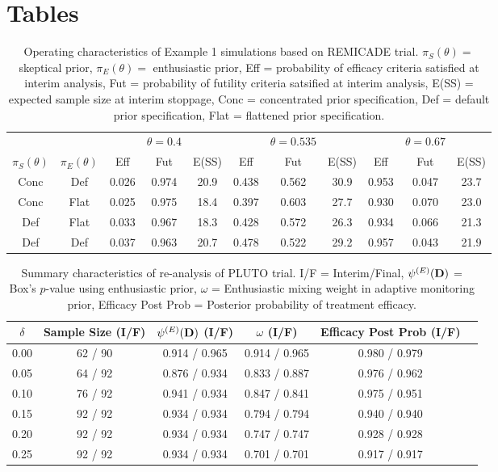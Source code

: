 \documentclass[12pt]{article}
\begin{document}
\newpage
\section*{Tables}

\begin{table}[htbp]\label{tbl:sim-remi}%
\centering
\caption{Operating characteristics of Example 1 simulations based on REMICADE trial. $\pi_S(\theta)=$ skeptical prior, $\pi_E(\theta)=$ enthusiastic prior, Eff = probability of efficacy criteria satisfied at interim analysis, Fut = probability of futility criteria satsified at interim analysis, E(SS) = expected sample size at interim stoppage, Conc = concentrated prior specification, Def = default prior specification, Flat = flattened prior specification. }%
\begin{tabular*}{500pt}{@{\extracolsep\fill}ccccccccccc@{\extracolsep\fill}}%
\toprule
	&		&	&		$\theta=0.4$&			&		&	$\theta=0.535$	&		&	&		$\theta=0.67$&		\\
	\cline{3-5} \cline{6-8} \cline{9-11}
$\pi_S(\theta)$	&	$\pi_E(\theta)$	&	Eff  &	Fut 	&	E(SS) &	Eff  &	Fut 	&	E(SS) 	&	Eff  &	Fut 	&	E(SS) 	\\
\midrule
Conc	&	Def	&	0.026	&	0.974	&	20.9 	&	0.438	&	0.562	&	30.9	&	0.953	&	0.047	&	23.7	\\
Conc	&	Flat	&	0.025	&	0.975	&	18.4 	&	0.397	&	0.603	&	27.7	&	0.930	&	0.070	&	23.0	\\
Def	&	Flat	&	0.033	&	0.967	&	18.3	&	0.428	&	0.572	&	26.3	&	0.934	&	0.066	&	21.3 	\\
Def	&	Def	&	0.037	&	0.963	&	20.7	&	0.478	&	0.522	&	29.2 	&	0.957	&	0.043	&	21.9	\\
\bottomrule
\end{tabular*}
\end{table}

\newpage
\begin{table}[htbp]\label{tbl:real-pluto}%
\centering
\caption{Summary characteristics of re-analysis of PLUTO trial. I/F = Interim/Final, $\psi^{(E)}(\textcolor{black}{\mathbf{D}})$ = Box's $p$-value using enthusiastic prior, $\omega$ = Enthusiastic mixing weight in adaptive monitoring prior, Efficacy Post Prob = Posterior probability of treatment efficacy.}%
\begin{tabular*}{450pt}{@{\extracolsep\fill}cccccc@{\extracolsep\fill}}%
\toprule
$\delta$	&	Sample Size (I/F)			&	$\psi^{(E)}(\textcolor{black}{\mathbf{D}})$ (I/F)			&	$\omega$ (I/F)			&	Efficacy Post Prob (I/F)			\\
\midrule
0.00	&	62	/	90	&	0.914	/	0.965	&	0.914	/	0.965	&	0.980	/	0.979	\\
0.05	&	64	/	92	&	0.876	/	0.934	&	0.833	/	0.887	&	0.976	/	0.962	\\
0.10	&	76	/	92	&	0.941	/	0.934	&	0.847	/	0.841	&	0.975	/	0.951	\\
0.15	&	92	/	92	&	0.934	/	0.934	&	0.794	/	0.794	&	0.940	/	0.940	\\
0.20	&	92	/	92	&	0.934	/	0.934	&	0.747	/	0.747	&	0.928	/	0.928	\\
0.25	&	92	/	92	&	0.934	/	0.934	&	0.701	/	0.701	&	0.917	/	0.917	\\
\bottomrule
\end{tabular*}
\end{table}
\end{document}
